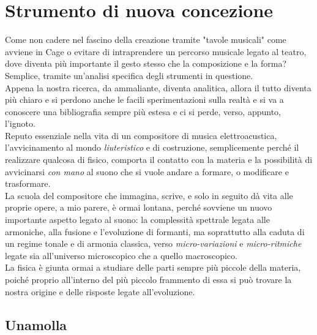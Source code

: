 
\chapter{Strumento di nuova concezione}
\label{Strumento di nuova concezione}

Come non cadere nel fascino della creazione tramite "tavole musicali" come avviene in Cage o evitare di intraprendere un percorso musicale legato al teatro, dove diventa più importante il gesto stesso che la composizione e la forma? Semplice, tramite un'analisi specifica degli strumenti in questione. \\
Appena la nostra ricerca, da ammaliante, diventa analitica, allora il tutto diventa più chiaro e si perdono anche le facili sperimentazioni sulla realtà e si va a conoscere una bibliografia sempre più estesa e ci si perde, verso, appunto, l'ignoto. \\
Reputo essenziale nella vita di un compositore di musica elettroacustica, l'avvicinamento al mondo \textit{liuteristico} e di costruzione, semplicemente perché il realizzare qualcosa di fisico, comporta il contatto con la materia e la possibilità di avvicinarsi \textit{con mano} al suono che si vuole andare a formare, o modificare e trasformare. \\
La scuola del compositore che immagina, scrive, e solo in seguito dà vita alle proprie opere, a mio parere, è ormai lontana, perché sovviene un nuovo importante aspetto legato al suono: la complessità spettrale legata alle armoniche, alla fusione e l’evoluzione di formanti, ma soprattutto alla caduta di un regime tonale e di armonia classica, verso \textit{micro-variazioni} e \textit{micro-ritmiche} legate sia all’universo microscopico che a quello macroscopico. \\
La fisica è giunta ormai a studiare delle parti sempre più piccole della materia, poiché proprio all’interno del più piccolo frammento di essa si può trovare la nostra origine e delle risposte legate all’evoluzione. 





\section{Unamolla}

